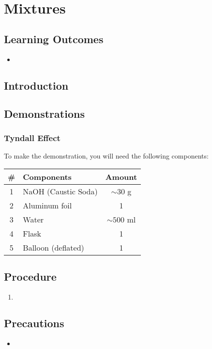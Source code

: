 \chapter{Mixtures}

\section*{Learning Outcomes}
\small{
\begin{itemize}[leftmargin=*]\itemsep0em
\item 
\end{itemize}
}
\section*{Introduction}

\section*{Demonstrations}
\subsection*{Tyndall Effect}

To make the demonstration, you will need the following components:
\begin{table}[H]
    \centering
    \begin{tabular}{|c|l|c|}\hline
     \textbf{\#} & \textbf{Components} &  \textbf{Amount}\\\hline
     1 & NaOH (Caustic Soda)&   $\sim 30$ g\\\hline
     2 & Aluminum foil      &   1           \\\hline
     3 & Water              &   $\sim 500$ ml\\\hline
     4 & Flask              &  1            \\\hline
     5 & Balloon (deflated) &  1             \\\hline
    \end{tabular}
\end{table}

\section*{Procedure}
\begin{enumerate}
    \item 
\end{enumerate}



\section*{Precautions}
\begin{itemize}[leftmargin=*]
\item 
\end{itemize}


